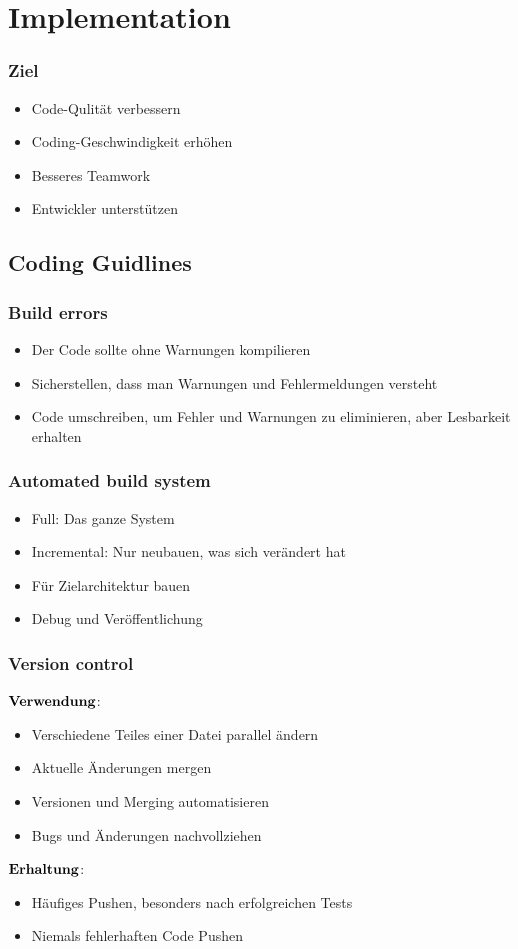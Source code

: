 \section{Implementation}
\subsubsection{Ziel}
\begin{itemize}
	\item Code-Qulität verbessern
	\item Coding-Geschwindigkeit erhöhen
	\item Besseres Teamwork
	\item Entwickler unterstützen
\end{itemize}
\subsection{Coding Guidlines}
\subsubsection{Build errors}
\begin{itemize}
	\item Der Code sollte ohne Warnungen kompilieren
	\item Sicherstellen, dass man Warnungen und Fehlermeldungen versteht
	\item Code umschreiben, um Fehler und Warnungen zu eliminieren, aber Lesbarkeit erhalten
\end{itemize}
\subsubsection{Automated build system}
\begin{itemize}
	\item Full: Das ganze System 
	\item Incremental: Nur neubauen, was sich verändert hat
	\item Für Zielarchitektur bauen
	\item Debug und Veröffentlichung
\end{itemize}
\subsubsection{Version control}
$\bold{Verwendung}$:
\begin{itemize}
	\item Verschiedene Teiles einer Datei parallel ändern
	\item Aktuelle Änderungen mergen
	\item Versionen und Merging automatisieren
	\item Bugs und Änderungen nachvollziehen 
\end{itemize}
$\bold{Erhaltung}$:
\begin{itemize}
	\item Häufiges Pushen, besonders nach erfolgreichen Tests
	\item Niemals fehlerhaften Code Pushen 
\end{itemize}
